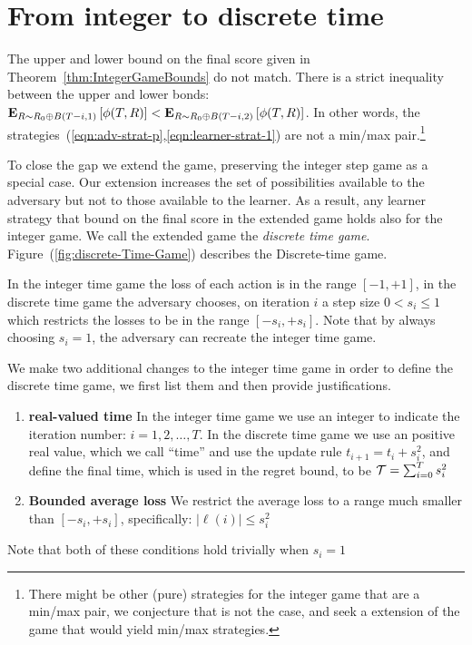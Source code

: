\documentclass{article}[12pt]
\begin{document}
\section{From integer to discrete time}
\label{sec:discrete}

The upper and lower bound on the final score given in
Theorem~\ref{thm:IntegerGameBounds} do not match. There is a strict
inequality between the upper and lower
bonds:${\bf E}_{R \sim R_0 \oplus B(T-i,1)}\left[ \phi(T,R) \right] < {\bf E}_{R \sim R_0
  \oplus B(T-i,2)}\left[ \phi(T,R) \right]$. In other words, the
strategies~(\ref{eqn:adv-strat-p},\ref{eqn:learner-strat-1}) are not a
min/max pair.\footnote{There might be other (pure) strategies for the integer
game that are a min/max pair, we conjecture that is not the case, and
seek a extension of the game that would yield min/max strategies.}

To close the gap we extend the game, preserving the integer step game
as a special case. Our extension increases the set of possibilities
available to the adversary but not to those available to the
learner. As a result, any learner strategy that bound on the final
score in the extended game holds also for the integer game. We call
the extended game the {\em discrete time game}.
Figure~(\ref{fig:discrete-Time-Game}) describes the Discrete-time
game.


In the integer time game the loss of each action is in the range
$[-1,+1]$, in the discrete time game the adversary chooses, on
iteration $i$ a step size $0<s_i\leq 1$ which restricts the losses to
be in the range $[-s_i,+s_i]$. Note that by always choosing $s_i=1$,
the adversary can recreate the integer time game.

We make two additional changes to the integer time game in order to define
the discrete time game, we first list them and then provide justifications.
\begin{enumerate}
\item {\bf real-valued time} In the integer time game we use an
  integer to indicate the iteration number: $i=1,2,\ldots,T$. In the
  discrete time game we use an positive real value, which we call
  ``time'' and use the update rule $t_{i+1} = t_i + s_i^2$, and define
  the final time, which is used in the regret bound, to be
  $\mathcal{T}=\sum_{i=0}^T s_i^2$
\item {\bf Bounded average loss} We restrict the average loss to a
  range much smaller than $[-s_i,+s_i]$, specifically:
  $|\ell(i)| \leq s_i^2$
\end{enumerate}
Note that both of these conditions hold trivially when $s_i=1$
\end{document}
